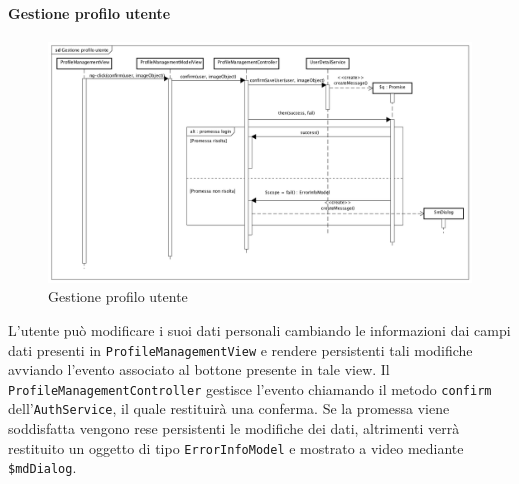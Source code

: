 \paragraph{Gestione profilo utente}

\label{Gestione profilo utente}

\begin{figure}[ht]
	\centering
	\includegraphics[scale=0.375,keepaspectratio]{UML/DiagrammiDiSequenza/Front-end/ProfileManagement.png}
	\caption{Gestione profilo utente}
\end{figure} \FloatBarrier

L'utente può modificare i suoi dati personali cambiando le informazioni dai campi dati presenti in \texttt{ProfileManagementView} e rendere persistenti tali modifiche avviando l'evento associato al bottone presente in tale view. Il \texttt{ProfileManagementController} gestisce l'evento chiamando il metodo \texttt{confirm} dell'\texttt{AuthService}, il quale restituirà una conferma. Se la promessa viene soddisfatta vengono rese persistenti le modifiche dei dati, altrimenti  verrà restituito un oggetto di tipo \texttt{ErrorInfoModel} e mostrato a video mediante \texttt{\$mdDialog}. 